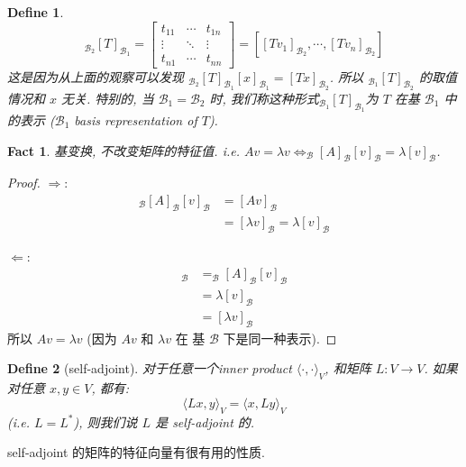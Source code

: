 \documentclass{article}
\newtheorem{define}{Define}
\newtheorem{fact}{Fact}
\def\<{\langle}
\def\>{\rangle}
\begin{document}
\begin{define}
\[ _{\mathcal{B}_2}[T]_{\mathcal{B}_1} = 
  \left[
  \begin{array}{ccc}
    t_{11}&\cdots& t_{1n} \\
    \vdots & \ddots & \vdots \\
    t_{n1} & \cdots & t_{nn}
  \end{array}
\right] =
[[Tv_1]_{\mathcal{B}_2}, \cdots, [Tv_n]_{\mathcal{B}_2}]
\]
这是因为从上面的观察可以发现 $_{\mathcal{B}_2}[T]_{\mathcal{B}_1}[x]_{\mathcal{B}_1} = [Tx]_{\mathcal{B}_2}$.
所以 $_{\mathcal{B}_1}[T]_{\mathcal{B}_2}$ 的取值情况和 $x$ 无关.
特别的, 当 $\mathcal{B}_1 = \mathcal{B}_2$ 时, 我们称这种形式$_{\mathcal{B}_1}[T]_{\mathcal{B}_1}$为 $T$ 在基 $\mathcal{B}_1$ 中的表示 ($\mathcal{B}_1$ basis representation of $T$).
\end{define}

\begin{fact}
  基变换, 不改变矩阵的特征值.
  i.e. $Av = \lambda v \Leftrightarrow _{\mathcal{B}}[A]_{\mathcal{B}}[v]_{\mathcal{B}} = \lambda [v]_{\mathcal{B}}$.
\end{fact}
\begin{proof}
  $\Rightarrow$:\\
  \begin{align*}
    _{\mathcal{B}}[A]_{\mathcal{B}}[v]_{\mathcal{B}} &= [Av]_{\mathcal{B}} \\
    &= [\lambda v]_{\mathcal{B}} = \lambda [v]_{\mathcal{B}}
  \end{align*}

  $\Leftarrow$:\\
  \begin{align*}
    [Av]_{\mathcal{B}} &= _{\mathcal{B}}[A]_{\mathcal{B}}[v]_{\mathcal{B}} \\
    &= \lambda [v]_{\mathcal{B}} \\
    &= [\lambda v]_{\mathcal{B}}
  \end{align*}
  所以 $Av = \lambda v$ (因为 $Av$ 和 $\lambda v$ 在 基 $\mathcal{B}$ 下是同一种表示).
\end{proof}

\begin{define}[self-adjoint]
  对于任意一个inner product $\<\cdot, \cdot\>_V$, 和矩阵 $L: V\to V$.
  如果对任意 $x, y\in V$, 都有:
  \[\<Lx, y\>_V = \<x, Ly\>_V\]
  (i.e. $L = L^*$), 则我们说 $L$ 是 self-adjoint 的.
\end{define}
self-adjoint 的矩阵的特征向量有很有用的性质.
\end{document}
